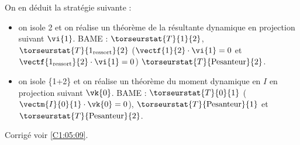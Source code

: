 On en déduit la stratégie suivante : 
\begin{itemize}
\item on isole 2 et on réalise un théorème de la résultante dynamique en projection suivant $\vi{1}$. BAME : 
$\torseurstat{T}{1}{2}$, $\torseurstat{T}{1_{\text{ressort}}}{2}$ ($\vectf{1}{2}\cdot \vi{1}= 0$ et 
$\vectf{1_{\text{ressort}}}{2}\cdot \vi{1}= 0$)
$\torseurstat{T}{\text{Pesanteur}}{2}$.
\item on isole \{1+2\} et on réalise un théorème du moment dynamique en $I$ en projection suivant $\vk{0}$. BAME : 
$\torseurstat{T}{0}{1}$ ($\vectm{I}{0}{1}\cdot \vk{0}= 0$), 
$\torseurstat{T}{\text{Pesanteur}}{1}$ et $\torseurstat{T}{\text{Pesanteur}}{2}$.

\end{itemize}
\else
\fi

\ifprof
\else
\begin{flushright}
\footnotesize{Corrigé  voir \ref{C1:05:09}.}
\end{flushright}%
\fi